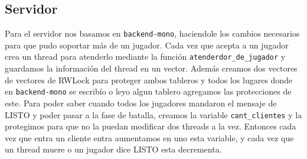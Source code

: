 \documentclass[hidelinks,a4paper,12pt, nofootinbib]{article}
\begin{document}
\subsection{Servidor}
Para el servidor nos basamos en \texttt{backend-mono}, haciendole los cambios necesarios para que pudo soportar más de un jugador. 
Cada vez que acepta a un jugador crea un thread para atenderlo mediante la función \texttt{atenderdor_de_jugador} y guardamos la información del thread en un vector. Además creamos dos vectores de vectores de RWLock para proteger ambos tableros y todos los lugares donde en \texttt{backend-mono} se escribío o leyo algun tablero agregamos las protecciones de este.
Para poder saber cuando todos los jugadores mandaron el mensaje de LISTO y poder pasar a la fase de batalla, creamos la variable \texttt{cant\_clientes} y la protegimos para que no la puedan modificar dos threads a la vez. Entonces cada vez que entra un cliente entra aumentamos en uno esta variable, y cada vez que un thread muere o un jugador dice LISTO esta decrementa.
\end{document}
